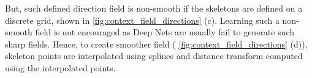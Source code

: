 But, such defined direction field is non-smooth if the skeletons are defined on a discrete grid, shown in \autoref{fig:context_field_directions} (c). Learning such a non-smooth field is not encouraged as Deep Nets are usually fail to generate such sharp fields. Hence, to create smoother field ( \autoref{fig:context_field_directions} (d)), skeleton points are interpolated using splines and distance transform computed using the interpolated points.

